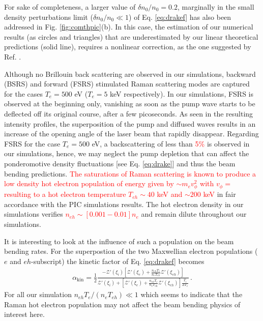 \documentclass[%
 reprint,
 amsmath,amssymb,
 aps,
]{revtex4-1}
\begin{document}
For sake of completeness, a larger value of $\delta n_0/n_0=0.2$, marginally in the small density perturbations limit ($\delta n_0/n_0 \ll 1$) of Eq.  \eqref{eq:drakef} has also been addressed in Fig. \ref{fig:comthpic}(b).
In this case, the estimation of our  numerical results (as circles and triangles) that are underestimated  by our linear theoretical predictions (solid line), requires a nonlinear correction, as the one suggested by  Ref.
\cite[]{PRL_Casanova_85,PFB_Rozmus_1992}.

Although no Brillouin back scattering are observed in our simulations, backward (BSRS) and forward (FSRS) stimulated Raman scattering modes are captured for the cases $T_e=500$ eV ($T_e=5$ keV respectively). 
In our simulations, FSRS is observed at the beginning only, vanishing as soon as the pump wave starts to be deflected off its original course, after a few picoseconds. As seen in the resulting intensity profiles, the superposition of the pump and diffused waves results in an increase of the opening angle of the laser beam that rapidly  disappear.
Regarding FSRS for the case $T_e=500$ eV, a backscattering of less than \textcolor{red}{ 5\%} is observed in our simulations, hence, we may neglect the pump depletion that can affect the ponderomotive density fluctuations [see Eq. \eqref{eq:drake}] and thus the beam bending predictions.
\textcolor{red}{ 
The saturations of Raman scattering is known to produce a low density hot electron population of energy given by $\sim m_e v_\phi^2 $ with $v_\phi =$ resulting to a hot electron temperature 
$T_{eh}\sim 40$ keV and $\sim 200$ keV } in fair accordance with the PIC simulations results.  The hot electron density in our simulations verifies 
\textcolor{red}{ $n_{eh}\sim [0.001-0.01]n_e$  } and remain dilute throughout our simulations. 

It is interesting to look at the influence of such a population on the beam bending rates. For the superpostion of the two Maxwellian electron populations ($e$ and $eh$-subscript) the kinetic factor of Eq. \eqref{eq:drakef} becomes 
\begin{align}
 \alpha_ \mathrm{kin}    =\frac{1}{2} \frac{-\mathcal{Z}'( \xi_i) [\mathcal{Z}'( \xi_e)  +\frac{n_{eh}T_e}{n_eT_{eh}}\mathcal{Z}'( \xi_{eh})] }{  \mathcal{Z}'( \xi_i) +[\mathcal{Z}'( \xi_e)  +\frac{n_{eh}T_e}{n_eT_{eh}}\mathcal{Z}'( \xi_{eh})]\frac{ T_i }{  ZT_e} } \, . \label{eq:drakefeh} 
\end{align}
For all our simulation $n_{eh}T_e/ (n_eT_{eh}) \ll 1$ which seems to indicate that the Raman hot electron population may not affect the beam bending physics of interest here. 
\end{document}

